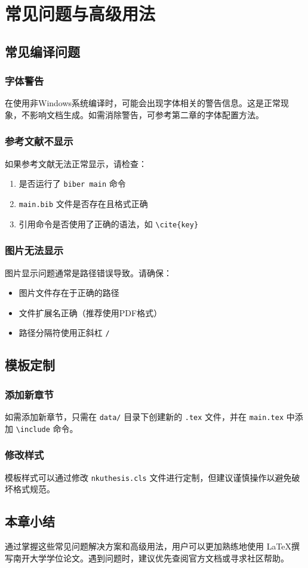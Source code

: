 
\chapter{常见问题与高级用法}

\section{常见编译问题}

\subsection{字体警告}

在使用非Windows系统编译时，可能会出现字体相关的警告信息。这是正常现象，不影响文档生成。如需消除警告，可参考第二章的字体配置方法。

\subsection{参考文献不显示}

如果参考文献无法正常显示，请检查：

\begin{enumerate}
    \item 是否运行了 \texttt{biber main} 命令
    \item \texttt{main.bib} 文件是否存在且格式正确
    \item 引用命令是否使用了正确的语法，如 \texttt{\textbackslash cite\{key\}}
\end{enumerate}

\subsection{图片无法显示}

图片显示问题通常是路径错误导致。请确保：

\begin{itemize}
    \item 图片文件存在于正确的路径
    \item 文件扩展名正确（推荐使用PDF格式）
    \item 路径分隔符使用正斜杠 \texttt{/}
\end{itemize}

\section{模板定制}

\subsection{添加新章节}

如需添加新章节，只需在 \texttt{data/} 目录下创建新的 \texttt{.tex} 文件，并在 \texttt{main.tex} 中添加 \texttt{\textbackslash include} 命令。

\subsection{修改样式}

模板样式可以通过修改 \texttt{nkuthesis.cls} 文件进行定制，但建议谨慎操作以避免破坏格式规范。

\section{本章小结}

通过掌握这些常见问题解决方案和高级用法，用户可以更加熟练地使用 \LaTeX 撰写南开大学学位论文。遇到问题时，建议优先查阅官方文档或寻求社区帮助。
